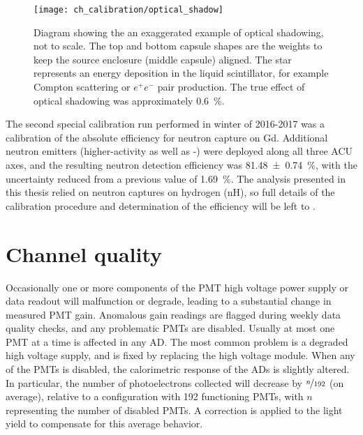 \begin{figure}
    \centering
    \texttt{[image: ch\_calibration/optical\_shadow]}
    \caption{
        Diagram showing the an exaggerated example of optical shadowing,
        not to scale.
        The top and bottom capsule shapes are the weights
        to keep the source enclosure (middle capsule) aligned.
        The star represents an energy deposition in the liquid scintillator,
        for example Compton scattering or $e^+e^-$ pair production.
        The true effect of optical shadowing was approximately \SI{0.6}{\percent}.
    }
    \label{fig:optical_shadowing}
\end{figure}

The second special calibration run performed in winter of 2016-2017
was a calibration of the absolute efficiency for neutron capture on Gd.
Additional neutron emitters
(higher-activity \amc{} as well as -)
were deployed along all three ACU axes,
and the resulting neutron detection efficiency
was \SI{81.48\pm0.74}{\percent},
with the uncertainty reduced from a previous value of \SI{1.69}{\percent}.
The analysis presented in this thesis
relied on neutron captures on hydrogen (nH),
so full details of the calibration procedure and determination of the efficiency
will be left to \cite{reactor_flux2019}.

\section{Channel quality}
\label{sec:channel_quality}

Occasionally one or more components of the PMT high voltage power supply
or data readout will malfunction or degrade,
leading to a substantial change in measured PMT gain.
Anomalous gain readings are flagged during weekly data quality checks,
and any problematic PMTs are disabled.
Usually at most one PMT at a time is affected in any AD.
The most common problem is a degraded high voltage supply,
and is fixed by replacing the high voltage module.
When any of the PMTs is disabled, the calorimetric response of the ADs
is slightly altered.
In particular, the number of photoelectrons collected
will decrease by $\nicefrac{n}{192}$ (on average),
relative to a configuration with \num{192} functioning PMTs,
with $n$ representing the number of disabled PMTs.
A correction is applied to the light yield to compensate for this average behavior.

